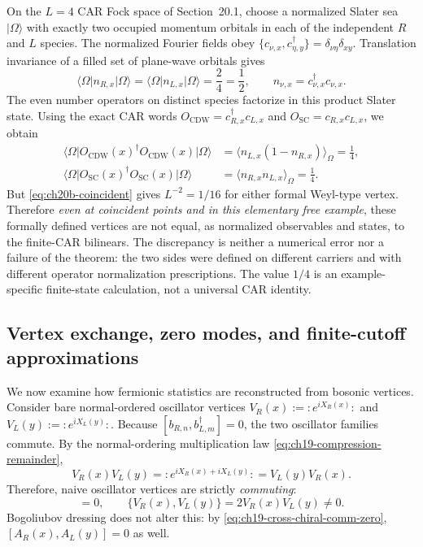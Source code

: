 \begin{example}
\label{ex:ch20b-finite-counterexample}
On the \(L=4\) CAR Fock space of Section~20.1, choose a normalized
Slater sea \(\lvert\Omega\rangle\) with exactly two occupied momentum
orbitals in each of the independent \(R\) and \(L\) species.  The
normalized Fourier fields obey
\(\{c_{\nu,x},c_{\eta,y}^\dagger\}=
 \delta_{\nu\eta}\delta_{xy}\).
Translation invariance of a filled set of plane-wave orbitals gives
\[
 \langle\Omega\lvert n_{R,x}\rvert\Omega\rangle
 =\langle\Omega\lvert n_{L,x}\rvert\Omega\rangle=\frac24=\frac12,
 \qquad n_{\nu,x}=c_{\nu,x}^\dagger c_{\nu,x}.
\]
The even number operators on distinct species factorize in this
product Slater state.  Using the exact CAR words
\(O_{\mathrm{CDW}}=c_{R,x}^\dagger c_{L,x}\) and
\(O_{\mathrm{SC}}=c_{R,x}c_{L,x}\), we obtain
\begin{align*}
 \langle\Omega\lvert O_{\mathrm{CDW}}(x)^\dagger
               O_{\mathrm{CDW}}(x)\rvert\Omega\rangle
 &=\langle n_{L,x}(1-n_{R,x})\rangle_\Omega=\tfrac14,\\
 \langle\Omega\lvert O_{\mathrm{SC}}(x)^\dagger
               O_{\mathrm{SC}}(x)\rvert\Omega\rangle
 &=\langle n_{R,x}n_{L,x}\rangle_\Omega=\tfrac14.
\end{align*}
But \eqref{eq:ch20b-coincident} gives \(L^{-2}=1/16\) for either
formal Weyl-type vertex.  Therefore \emph{even at coincident points and
in this elementary free example}, these formally defined vertices are
not equal, as normalized observables and states, to the finite-CAR
bilinears.  The discrepancy is neither a numerical error nor a failure
of the theorem: the two sides were defined on different carriers and
with different operator normalization prescriptions.  The value
\(1/4\) is an example-specific finite-state calculation, not a
universal CAR identity.
\end{example}

\subsection{Vertex exchange, zero modes, and finite-cutoff approximations}
\label{subsec:ch20b-vertex-exchange}

We now examine how fermionic statistics are reconstructed from bosonic vertices.
Consider bare normal-ordered oscillator vertices $V_R(x) := :\!e^{i X_R(x)}\!:$ and
$V_L(y) := :\!e^{i X_L(y)}\!:$.
Because $[b_{R,n}, b_{L,m}^\dagger] = 0$, the two oscillator families commute.
By the normal-ordering multiplication law \eqref{eq:ch19-compression-remainder},
\[
 V_R(x) V_L(y) = :\!e^{i X_R(x) + i X_L(y)}\!: = V_L(y) V_R(x).
\]
Therefore, naive oscillator vertices are strictly \emph{commuting}:
\begin{equation}
 [V_R(x), V_L(y)] = 0, \qquad \{V_R(x), V_L(y)\} = 2 V_R(x) V_L(y) \ne 0.
 \label{eq:ch20b-naive-commuting}
\end{equation}
Bogoliubov dressing does not alter this: by \eqref{eq:ch19-cross-chiral-comm-zero},
$[A_R(x), A_L(y)] = 0$ as well.

